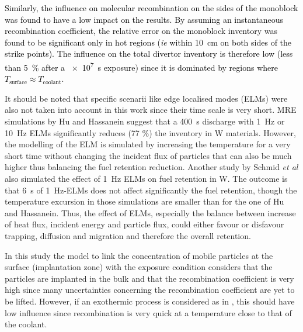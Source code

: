 \textcolor{black}{Similarly, the influence on molecular recombination on the sides of the monoblock was found to have a low impact on the results.
By assuming an instantaneous recombination coefficient, the relative error on the monoblock inventory was found to be significant only in hot regions (\textit{ie} within \SI{10}{cm} on both sides of the strike points).
The influence on the total divertor inventory is therefore low (less than \SI{5}{\%} after a \SI{e7}{s} exposure) since it is dominated by regions where $T_\mathrm{surface} \approx T_\mathrm{coolant}$.}

It should be noted that specific scenarii like edge localised modes (ELMs) were also not taken into account in this work since their time scale is very short.
MRE simulations by Hu and Hassanein \cite{hu_predicting_2015} suggest that a \SI{400}{s} discharge with \SI{1}{Hz} or \SI{10}{Hz} ELMs significantly reduces (77 \%) the inventory in W materials.
However, the modelling of the ELM is simulated by increasing the temperature for a very short time without changing the incident flux of particles that can also be much higher thus balancing the fuel retention reduction.
Another study by Schmid \textit{et al} \cite{schmid_diffusion-trapping_2016} also simulated the effect of \SI{1}{Hz} ELMs on fuel retention in W.
The outcome is that \SI{6}{s} of \SI{1}{Hz}-ELMs does not affect significantly the fuel retention, though the temperature excursion in those simulations are smaller than for the one of Hu and Hassanein.
Thus, the effect of ELMs, especially the balance between increase of heat flux, incident energy and particle flux, could either favour or disfavour trapping, diffusion and migration and therefore the overall retention.

In this study the model to link the concentration of mobile particles at the surface (implantation zone) with the exposure condition considers that the particles are implanted in the bulk and that the recombination coefficient is very high since many uncertainties concerning the recombination coefficient are yet to be lifted.
However, if an exothermic process is considered as in \cite{ogorodnikova_recombination_2019}, this should have low influence since recombination is very quick at a temperature close to that of the coolant.

